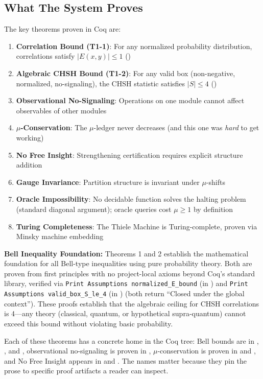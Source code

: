 \subsection{What The System Proves}

The key theorems proven in Coq are:
\begin{enumerate}
    \item \textbf{Correlation Bound (T1-1)}: For any normalized probability distribution, correlations satisfy $|E(x,y)| \leq 1$ ()
    \item \textbf{Algebraic CHSH Bound (T1-2)}: For any valid box (non-negative, normalized, no-signaling), the CHSH statistic satisfies $|S| \leq 4$ ()
    \item \textbf{Observational No-Signaling}: Operations on one module cannot affect observables of other modules
    \item \textbf{$\mu$-Conservation}: The $\mu$-ledger never decreases (and this one was \textit{hard} to get working)
    \item \textbf{No Free Insight}: Strengthening certification requires explicit structure addition
    \item \textbf{Gauge Invariance}: Partition structure is invariant under $\mu$-shifts
    \item \textbf{Oracle Impossibility}: No decidable function solves the halting problem (standard diagonal argument); oracle queries cost $\mu \geq 1$ by definition
    \item \textbf{Turing Completeness}: The Thiele Machine is Turing-complete, proven via Minsky machine embedding
\end{enumerate}

\textbf{Bell Inequality Foundation:} Theorems 1 and 2 establish the mathematical foundation for all Bell-type inequalities using pure probability theory. Both are proven from first principles with no project-local axioms beyond Coq's standard library, verified via \texttt{Print Assumptions normalized\_E\_bound} (in ) and \texttt{Print Assumptions valid\_box\_S\_le\_4} (in ) (both return ``Closed under the global context''). These proofs establish that the algebraic ceiling for CHSH correlations is 4---any theory (classical, quantum, or hypothetical supra-quantum) cannot exceed this bound without violating basic probability.

Each of these theorems has a concrete home in the Coq tree: Bell bounds are in , , and , observational no-signaling is proven in , $\mu$-conservation is proven in  and , and No Free Insight appears in  and . The names matter because they pin the prose to specific proof artifacts a reader can inspect.

